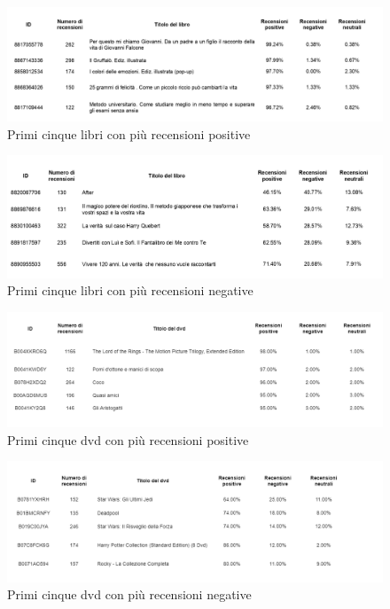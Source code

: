 \begin{description}
			\begin{figure} [h]
				\includegraphics[width=\textwidth]{Figure/top_pos_book_table}
				\caption{Primi cinque libri con più recensioni positive}
				\label{fig:top_pos_book_table}
			\end{figure}
			
			\begin{figure} [h]
				\includegraphics[width=\textwidth]{Figure/top_neg_book_table}
				\caption{Primi cinque libri con più recensioni negative}
				\label{fig:top_neg_book_table}
			\end{figure}
			
			\begin{figure} [h]
				\includegraphics[width=\textwidth]{Figure/top_pos_film_table}
				\caption{Primi cinque dvd con più recensioni positive}
				\label{fig:top_pos_film_table}
			\end{figure}
			
			\begin{figure} [h]
				\includegraphics[width=\textwidth]{Figure/top_neg_film_table}
				\caption{Primi cinque dvd con più recensioni negative}
				\label{fig:top_neg_film_table}
			\end{figure}
			

\end{description}
